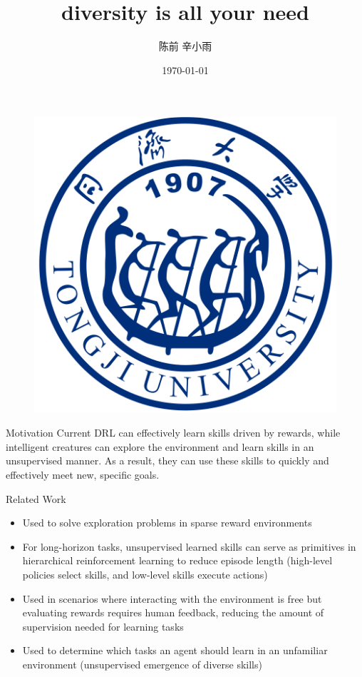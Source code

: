 \documentclass{beamer}
\author[Author]{陈前 辛小雨}
\title{diversity is all your need}
\institute{同济大学}
\date{\today}
\begin{document}
\begin{frame}
    \titlepage
    \begin{figure}[htpb]
       \begin{center}
            \includegraphics[width=0.2\linewidth]{pic/tongji_logo.png}
        \end{center}
    \end{figure}
\end{frame}

\begin{frame}{Motivation}
    Current DRL can effectively learn skills driven by rewards, while intelligent creatures can explore the environment and learn skills in an unsupervised manner. As a result, they can use these skills to quickly and effectively meet new, specific goals.
\end{frame}

\begin{frame}{Related Work}
	\footnotesize
	\begin{itemize}
		\item Used to solve exploration problems in sparse reward environments
		\vspace{0.2cm}
		\item For long-horizon tasks, unsupervised learned skills can serve as primitives in hierarchical reinforcement learning to reduce episode length (high-level policies select skills, and low-level skills execute actions)
		\vspace{0.2cm}
		\item Used in scenarios where interacting with the environment is free but evaluating rewards requires human feedback, reducing the amount of supervision needed for learning tasks\vspace{0.2cm}
		\item Used to determine which tasks an agent should learn in an unfamiliar environment (unsupervised emergence of diverse skills)
	\end{itemize}
\end{frame}
\end{document}
